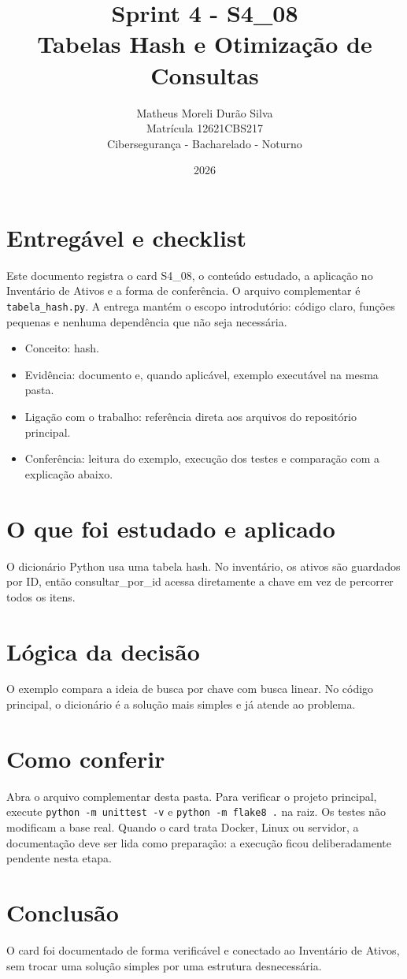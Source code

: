\documentclass[12pt]{article}
\title{Sprint 4 - S4\_08\\Tabelas Hash e Otimização de Consultas}
\author{Matheus Moreli Durão Silva\\ Matrícula 12621CBS217\\ Cibersegurança - Bacharelado - Noturno}
\date{2026}
\begin{document}
\maketitle

\section*{Entregável e checklist}
Este documento registra o card S4\_08, o conteúdo estudado, a aplicação no Inventário de Ativos e a forma de conferência. O arquivo complementar é \texttt{tabela\_hash.py}. A entrega mantém o escopo introdutório: código claro, funções pequenas e nenhuma dependência que não seja necessária.

\begin{itemize}
\item Conceito: hash.
\item Evidência: documento e, quando aplicável, exemplo executável na mesma pasta.
\item Ligação com o trabalho: referência direta aos arquivos do repositório principal.
\item Conferência: leitura do exemplo, execução dos testes e comparação com a explicação abaixo.
\end{itemize}

\section*{O que foi estudado e aplicado}
O dicionário Python usa uma tabela hash. No inventário, os ativos são guardados por ID, então consultar\_por\_id acessa diretamente a chave em vez de percorrer todos os itens.

\section*{Lógica da decisão}
O exemplo compara a ideia de busca por chave com busca linear. No código principal, o dicionário é a solução mais simples e já atende ao problema.

\section*{Como conferir}
Abra o arquivo complementar desta pasta. Para verificar o projeto principal, execute \texttt{python -m unittest -v} e \texttt{python -m flake8 .} na raiz. Os testes não modificam a base real. Quando o card trata Docker, Linux ou servidor, a documentação deve ser lida como preparação: a execução ficou deliberadamente pendente nesta etapa.

\section*{Conclusão}
O card foi documentado de forma verificável e conectado ao Inventário de Ativos, sem trocar uma solução simples por uma estrutura desnecessária.
\end{document}
